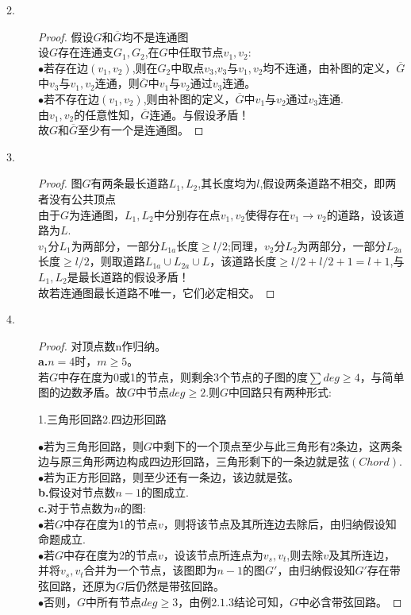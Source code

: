 \documentclass[UTF8, onecolumn, a4paper]{article}
\begin{document}
\begin{description}
\item[2.]
\begin{proof}
假设$G$和$\overline{G}$均不是连通图\\
设$G$存在连通支$G_1, G_2$,在$G$中任取节点$v_1, v_2$:\\
$\bullet$若存在边$(v_1, v_2)$,则在$G_2$中取点$v_3$,$v_3$与$v_1,v_2$均不连通，由补图的定义，$\overline{G}$中$v_3$与$v_1, v_2$连通，则$\overline{G}$中$v_1$与$v_2$通过$v_3$连通。\\
$\bullet$若不存在边$(v_1, v_2)$,则由补图的定义，$\overline{G}$中$v_1$与$v_2$通过$v_3$连通.\\
由$v_1, v_2$的任意性知，$\overline{G}$连通。与假设矛盾！\\
故$G$和$\overline{G}$至少有一个是连通图。
\end{proof}

\item[3.]
\begin{proof}
图$G$有两条最长道路$L_1, L_2$,其长度均为$l$,假设两条道路不相交，即两者没有公共顶点\\
由于$G$为连通图，$L_1,L_2$中分别存在点$v_1, v_2$使得存在$v_1\rightarrow v_2$的道路，设该道路为$L$.\\
$v_1$分$L_1$为两部分，一部分$L_{1a}$长度$\geq l/2$;同理，$v_2$分$L_2$为两部分，一部分$L_{2a}$长度$\geq l/2$，则取道路$L_{1a} \cup L_{2a} \cup L$，该道路长度$\geq l/2+l/2+1 = l+1$,与$L_1, L_2$是最长道路的假设矛盾！\\
故若连通图最长道路不唯一，它们必定相交。
\end{proof}

\item[4.]
\begin{proof}
对顶点数n作归纳。\\
\textbf{a.}$n = 4$时，$m\geq5$。\\
若$G$中存在度为0或1的节点，则剩余3个节点的子图的度$\sum deg \geq4$，与简单图的边数矛盾。故$G$中节点$deg\geq2$.则$G$中回路只有两种形式:
\begin{center}
	\quad1.三角形回路\quad2.四边形回路
\end{center}
$\bullet$若为三角形回路，则$G$中剩下的一个顶点至少与此三角形有2条边，这两条边与原三角形两边构成四边形回路，三角形剩下的一条边就是弦$(Chord)$.\\
\qquad$\bullet$若为正方形回路，则至少还有一条边，该边就是弦。\\
\textbf{b.}假设对节点数$n-1$的图成立.\\
\textbf{c.}对于节点数为$n$的图:\\
\qquad$\bullet$若$G$中存在度为1的节点$v$，则将该节点及其所连边去除后，由归纳假设知命题成立.\\
\qquad$\bullet$若$G$中存在度为2的节点$v$，设该节点所连点为$v_s, v_t$,则去除$v$及其所连边，并将$v_s, v_t$合并为一个节点，该图即为$n-1$的图$G'$，由归纳假设知$G'$存在带弦回路，还原为$G$后仍然是带弦回路。\\
\quad$\bullet$否则，$G$中所有节点$deg\geq 3$，由例$2.1.3$结论可知，$G$中必含带弦回路。
\end{proof}


\end{description}
\end{document}
